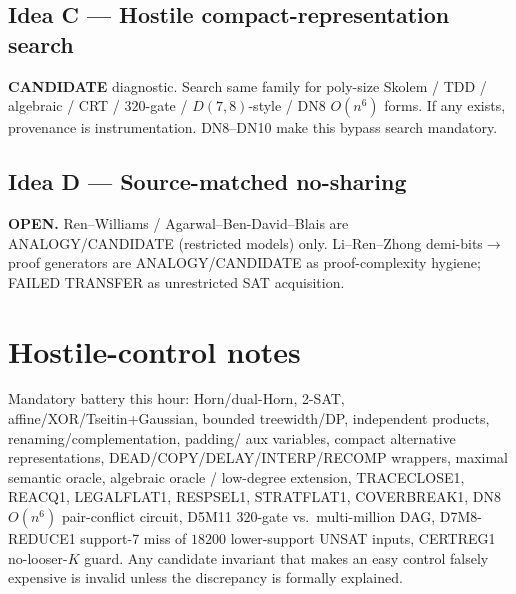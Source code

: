 \documentclass[11pt]{article}
\begin{document}
\subsection*{Idea C --- Hostile compact-representation search}
\textbf{CANDIDATE} diagnostic. Search same family for poly-size Skolem / TDD /
algebraic / CRT / $320$-gate / $D(7,8)$-style / DN8 $O(n^6)$ forms. If any exists,
provenance is instrumentation. DN8--DN10 make this bypass search mandatory.

\subsection*{Idea D --- Source-matched no-sharing}
\textbf{OPEN.} Ren--Williams / Agarwal--Ben-David--Blais are ANALOGY/CANDIDATE
(restricted models) only. Li--Ren--Zhong demi-bits$\to$proof generators are
ANALOGY/CANDIDATE as proof-complexity hygiene; FAILED TRANSFER as unrestricted
SAT acquisition.

\section*{Hostile-control notes}
Mandatory battery this hour: Horn/dual-Horn, 2-SAT, affine/XOR/Tseitin+Gaussian,
bounded treewidth/DP, independent products, renaming/complementation, padding/
aux variables, compact alternative representations, DEAD/COPY/DELAY/INTERP/RECOMP
wrappers, maximal semantic oracle, algebraic oracle / low-degree extension,
TRACECLOSE1, REACQ1, LEGALFLAT1, RESPSEL1, STRATFLAT1, COVERBREAK1,
DN8 $O(n^6)$ pair-conflict circuit, D5M11 $320$-gate vs.\ multi-million DAG,
D7M8-REDUCE1 support-7 miss of $18200$ lower-support UNSAT inputs, CERTREG1
no-looser-$K$ guard. Any candidate invariant that makes an easy control falsely
expensive is invalid unless the discrepancy is formally explained.
\end{document}
